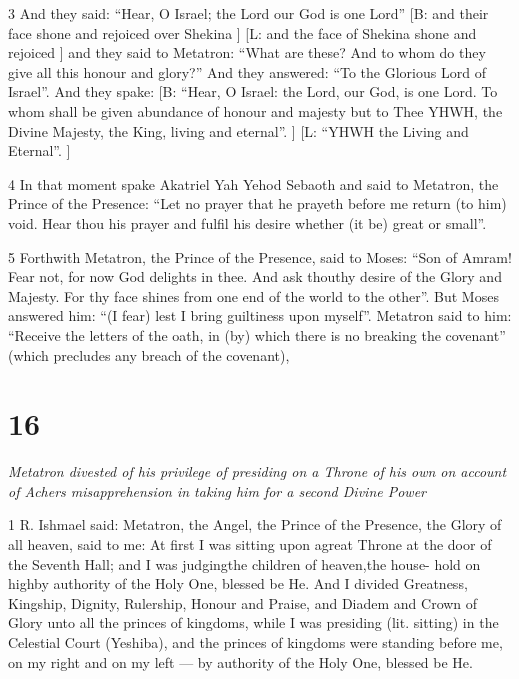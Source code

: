\par 3 And they said: “Hear, O Israel; the Lord our God is one Lord” [B: and their face shone and rejoiced over Shekina ] [L:  and the face of Shekina shone and rejoiced ] and they said to Metatron: “What are these? And to whom do they give all this honour and glory?” And they answered: “To the Glorious Lord of Israel”. And they spake: [B: “Hear, O Israel: the Lord, our God, is one Lord. To whom shall be given abundance of honour and majesty but to Thee YHWH, the Divine Majesty, the King, living and eternal”. ] [L: “YHWH the Living  and Eternal”. ]

\par 4 In that moment spake Akatriel Yah Yehod Sebaoth and said to Metatron, the Prince of the Presence: “Let no prayer that he prayeth before me return (to him) void. Hear thou his prayer and fulfil his desire whether (it be) great or small”. 

\par 5 Forthwith Metatron, the Prince of the Presence, said to Moses: “Son of Amram! Fear not, for now God delights in thee. And ask thouthy desire of the Glory and Majesty. For thy face shines from one end of the world to the other”. But Moses answered him: “(I fear) lest I bring guiltiness upon myself”. Metatron said to him: “Receive the letters of the oath, in (by) which there is no breaking the covenant” (which precludes any breach of the covenant), 

\chapter{16}

\par \textit{Metatron divested of his privilege of presiding on a Throne of his own on account of Achers misapprehension in taking him for a second Divine Power}

\par 1 R. Ishmael said: Metatron, the Angel, the Prince of the Presence, the Glory of all heaven, said to me: At first I was sitting upon agreat Throne at the door of the Seventh Hall; and I was judgingthe children of heaven,the house- hold on highby authority of the Holy One, blessed be He. And I divided Greatness, Kingship, Dignity, Rulership, Honour and Praise, and Diadem and Crown of Glory unto all the princes of kingdoms, while I was presiding (lit. sitting) in the Celestial Court (Yeshiba), and the princes of kingdoms were standing before me, on my right and on my left — by authority of the Holy One, blessed be He. 


